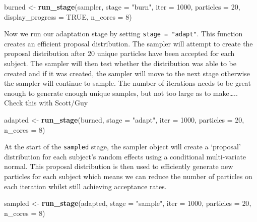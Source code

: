\documentclass[]{book}
\newenvironment{Shaded}{\begin{snugshade}}{\end{snugshade}}
\newcommand{\DataTypeTok}[1]{\textcolor[rgb]{0.13,0.29,0.53}{#1}}
\newcommand{\DecValTok}[1]{\textcolor[rgb]{0.00,0.00,0.81}{#1}}
\newcommand{\KeywordTok}[1]{\textcolor[rgb]{0.13,0.29,0.53}{\textbf{#1}}}
\newcommand{\NormalTok}[1]{#1}
\newcommand{\OtherTok}[1]{\textcolor[rgb]{0.56,0.35,0.01}{#1}}
\newcommand{\StringTok}[1]{\textcolor[rgb]{0.31,0.60,0.02}{#1}}
\begin{document}
\begin{Shaded}
\begin{Highlighting}[]
\NormalTok{burned <-}\StringTok{ }\KeywordTok{run_stage}\NormalTok{(sampler, }\DataTypeTok{stage =} \StringTok{"burn"}\NormalTok{, }\DataTypeTok{iter =} \DecValTok{1000}\NormalTok{, }\DataTypeTok{particles =} \DecValTok{20}\NormalTok{, }\DataTypeTok{display_progress =} \OtherTok{TRUE}\NormalTok{, }\DataTypeTok{n_cores =} \DecValTok{8}\NormalTok{)}
\end{Highlighting}
\end{Shaded}

Now we run our adaptation stage by setting \texttt{stage\ =\ "adapt"}. This function creates an efficient proposal distribution. The sampler will attempt to create the proposal distribution after 20 unique particles have been accepted for each subject. The sampler will then test whether the distribution was able to be created and if it was created, the sampler will move to the next stage otherwise the sampler will continue to sample. The number of iterations needs to be great enough to generate enough unique samples, but not too large as to make\ldots{}.. Check this with Scott/Guy

\begin{Shaded}
\begin{Highlighting}[]
\NormalTok{adapted <-}\StringTok{ }\KeywordTok{run_stage}\NormalTok{(burned, }\DataTypeTok{stage =} \StringTok{"adapt"}\NormalTok{, }\DataTypeTok{iter =} \DecValTok{1000}\NormalTok{, }\DataTypeTok{particles =} \DecValTok{20}\NormalTok{, }\DataTypeTok{n_cores =} \DecValTok{8}\NormalTok{)}
\end{Highlighting}
\end{Shaded}

At the start of the \texttt{sampled} stage, the sampler object will create a `proposal' distribution for each subject's random effects using a conditional multi-variate normal. This proposal distribution is then used to efficiently generate new particles for each subject which means we can reduce the number of particles on each iteration whilst still achieving acceptance rates.

\begin{Shaded}
\begin{Highlighting}[]
\NormalTok{sampled <-}\StringTok{ }\KeywordTok{run_stage}\NormalTok{(adapted, }\DataTypeTok{stage =} \StringTok{"sample"}\NormalTok{, }\DataTypeTok{iter =} \DecValTok{1000}\NormalTok{, }\DataTypeTok{particles =} \DecValTok{20}\NormalTok{, }\DataTypeTok{n_cores =} \DecValTok{8}\NormalTok{)}
\end{Highlighting}
\end{Shaded}
\end{document}

